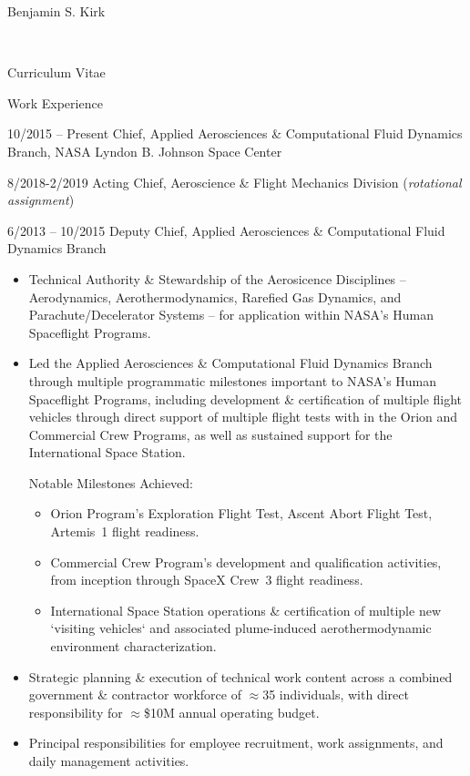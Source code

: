 \documentclass[10pt]{report}
\begin{document}
\begin{cv}{\centerline{\Large Benjamin S. Kirk}\\
    \centerline{\large Curriculum Vitae}}
  \vspace{-.5em}
  \begin{cvlist}{Work Experience}
  \item[10/2015 -- Present]
    Chief, Applied Aerosciences \& Computational Fluid Dynamics Branch,  NASA Lyndon B. Johnson Space Center
  \item[8/2018-2/2019]
    Acting Chief, Aeroscience \& Flight Mechanics Division (\emph{rotational assignment})
  \item[6/2013 -- 10/2015]
    Deputy Chief, Applied Aerosciences \& Computational Fluid Dynamics Branch
    \begin{itemize}
    \item
      Technical Authority \& Stewardship of the Aerosicence Disciplines -- Aerodynamics, Aerothermodynamics, Rarefied Gas Dynamics, and Parachute/Decelerator Systems -- for application within NASA's Human Spaceflight Programs.
    \item
      Led the Applied Aerosciences \& Computational Fluid Dynamics Branch through multiple programmatic milestones important to NASA's Human Spaceflight Programs, including development \& certification of multiple flight vehicles through direct support of multiple flight tests with in the Orion and Commercial Crew Programs, as well as sustained support for the International Space Station.

      Notable Milestones Achieved:
      \begin{itemize}
      \item Orion Program's Exploration Flight Test, Ascent Abort Flight Test, Artemis~1 flight readiness.
      \item Commercial Crew Program's development and qualification activities, from inception through SpaceX Crew~3 flight readiness.
      \item International Space Station operations \& certification of multiple new `visiting vehicles` and associated plume-induced aerothermodynamic environment characterization.
      \end{itemize}

    \item
      Strategic planning \& execution of technical work content across a combined government \& contractor workforce of $\approx$35 individuals, with direct responsibility for $\approx$\$10M annual operating budget.

    \item
      Principal responsibilities for employee recruitment, work assignments, and daily management activities.
    \end{itemize}



\end{cvlist}
\end{cv}
\end{document}

